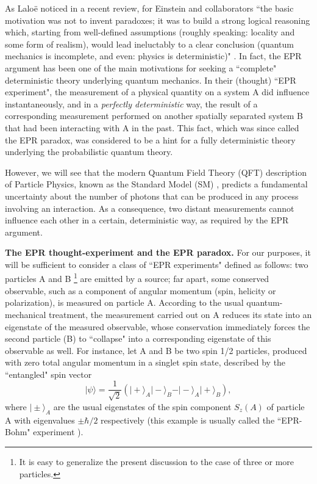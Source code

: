 \documentclass[aps,prl,showkeys,showpacs,preprint,groupedaddress]{revtex4}
\begin{document}
As Lalo\"e noticed in a recent review, for Einstein and
collaborators ``the basic motivation was not to invent paradoxes;
it was to build a strong logical reasoning which, starting from
well-defined assumptions (roughly speaking: locality and some form
of realism), would lead ineluctably to a clear conclusion (quantum
mechanics is incomplete, and even: physics is deterministic)"
\cite{Laloe}. In fact, the EPR argument has been one of the main
motivations for seeking a ``complete" deterministic theory
underlying quantum mechanics. In their (thought) ``EPR
experiment", the measurement of a physical quantity on a system A
did influence instantaneously, and in a {\it perfectly
deterministic} way, the result of a corresponding measurement
performed on another spatially separated system B that had been
interacting with A in the past. This fact, which was since called
the EPR paradox, was considered to be a hint for a fully
deterministic theory underlying the probabilistic quantum theory.

However, we will see that the modern Quantum Field Theory (QFT)
description of Particle Physics, known as the Standard Model (SM)
\cite{WeinbookI,WeinbookII}, predicts a fundamental uncertainty
about the number of photons that can be produced in any process
involving an interaction. As a consequence, two distant
measurements cannot influence each other in a certain,
deterministic way, as required by the EPR argument.

{\bf The EPR thought-experiment and the EPR paradox.} For our
purposes, it will be sufficient to consider a class of ``EPR
experiments" defined as follows: two particles A and B
\footnote{It is easy to generalize the present discussion to the
case of three or more particles.} are emitted by a source; far
apart, some conserved observable, such as a component of angular
momentum (spin, helicity or polarization), is measured on particle
A. According to the usual quantum-mechanical treatment, the
measurement carried out on A reduces its state into an eigenstate
of the measured observable, whose conservation immediately forces
the second particle (B) to ``collapse" into a corresponding
eigenstate of this observable as well. For instance, let A and B
be two spin 1/2 particles, produced with zero total angular
momentum in a singlet spin state, described by the ``entangled"
spin vector
\begin{equation}
\vert\psi\rangle=\frac{1}{\sqrt{2}}\left(\vert+\rangle_{A}\vert-\rangle_{B}
- \vert-\rangle_{A}\vert+\rangle_{B}\right), \label{entanglement}
\end{equation}
where $\vert\pm\rangle_A$ are the usual eigenstates of the spin
component $S_z(A)$ of particle A with eigenvalues $\pm\hbar/2$
respectively (this example is usually called the ``EPR-Bohm"
experiment \cite{Bohm,Laloe}).
\end{document}
